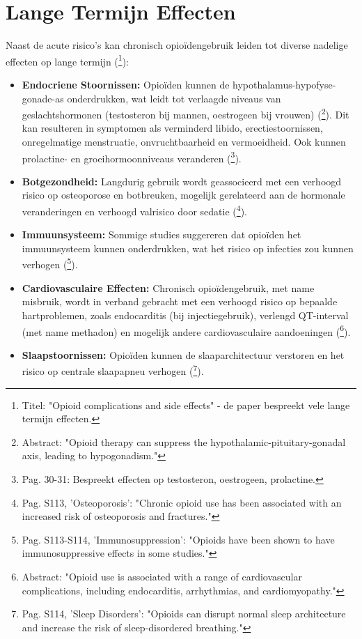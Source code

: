 \documentclass[11pt, a4paper]{report} %
\begin{document}
\section{Lange Termijn Effecten}
Naast de acute risico's kan chronisch opioïdengebruik leiden tot diverse nadelige effecten op lange termijn (\cite{Benyamin2008OpioidComplications}\footnote{Titel: "Opioid complications and side effects" - de paper bespreekt vele lange termijn effecten.}):
\begin{itemize}
    \item \textbf{Endocriene Stoornissen:} Opioïden kunnen de hypothalamus-hypofyse-gonade-as onderdrukken, wat leidt tot verlaagde niveaus van geslachtshormonen (testosteron bij mannen, oestrogeen bij vrouwen) (\cite{Brennan2013OpioidEndocrine}\footnote{Abstract: "Opioid therapy can suppress the hypothalamic-pituitary-gonadal axis, leading to hypogonadism."}). Dit kan resulteren in symptomen als verminderd libido, erectiestoornissen, onregelmatige menstruatie, onvruchtbaarheid en vermoeidheid. Ook kunnen prolactine- en groeihormoonniveaus veranderen (\cite{Brennan2013OpioidEndocrine}\footnote{Pag. 30-31: Bespreekt effecten op testosteron, oestrogeen, prolactine.}).
    \item \textbf{Botgezondheid:} Langdurig gebruik wordt geassocieerd met een verhoogd risico op osteoporose en botbreuken, mogelijk gerelateerd aan de hormonale veranderingen en verhoogd valrisico door sedatie (\cite{Benyamin2008OpioidComplications}\footnote{Pag. S113, 'Osteoporosis': "Chronic opioid use has been associated with an increased risk of osteoporosis and fractures."}).
    \item \textbf{Immuunsysteem:} Sommige studies suggereren dat opioïden het immuunsysteem kunnen onderdrukken, wat het risico op infecties zou kunnen verhogen (\cite{Benyamin2008OpioidComplications}\footnote{Pag. S113-S114, 'Immunosuppression': "Opioids have been shown to have immunosuppressive effects in some studies."}).
    \item \textbf{Cardiovasculaire Effecten:} Chronisch opioïdengebruik, met name misbruik, wordt in verband gebracht met een verhoogd risico op bepaalde hartproblemen, zoals endocarditis (bij injectiegebruik), verlengd QT-interval (met name methadon) en mogelijk andere cardiovasculaire aandoeningen (\cite{Thakkar2021CardioComplications}\footnote{Abstract: "Opioid use is associated with a range of cardiovascular complications, including endocarditis, arrhythmias, and cardiomyopathy."}).
    \item \textbf{Slaapstoornissen:} Opioïden kunnen de slaaparchitectuur verstoren en het risico op centrale slaapapneu verhogen (\cite{Benyamin2008OpioidComplications}\footnote{Pag. S114, 'Sleep Disorders': "Opioids can disrupt normal sleep architecture and increase the risk of sleep-disordered breathing."}).

\end{itemize}
\end{document}
